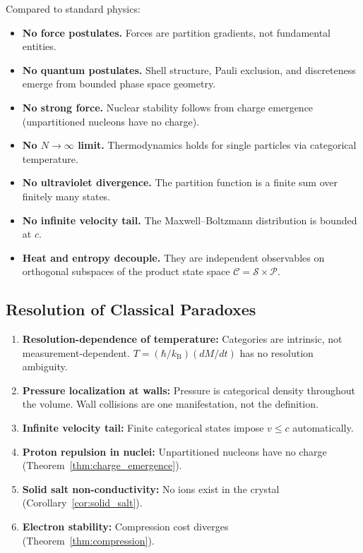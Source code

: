 \documentclass[twocolumn,10pt,a4paper]{article}
\theoremstyle{plain}
\theoremstyle{definition}
\theoremstyle{remark}
\newcommand{\kB}{k_{\mathrm{B}}}
\newcommand{\Partition}{\mathcal{P}}
\newcommand{\Cat}{\mathcal{C}}
\newcommand{\Sspace}{\mathcal{S}}
\begin{document}
Compared to standard physics:
\begin{itemize}
    \item \textbf{No force postulates.} Forces are partition gradients, not fundamental entities.
    \item \textbf{No quantum postulates.} Shell structure, Pauli exclusion, and discreteness emerge from bounded phase space geometry.
    \item \textbf{No strong force.} Nuclear stability follows from charge emergence (unpartitioned nucleons have no charge).
    \item \textbf{No $N \to \infty$ limit.} Thermodynamics holds for single particles via categorical temperature.
    \item \textbf{No ultraviolet divergence.} The partition function is a finite sum over finitely many states.
    \item \textbf{No infinite velocity tail.} The Maxwell--Boltzmann distribution is bounded at $c$.
    \item \textbf{Heat and entropy decouple.} They are independent observables on orthogonal subspaces of the product state space $\Cat = \Sspace \times \Partition$.
\end{itemize}

\subsection{Resolution of Classical Paradoxes}

\begin{enumerate}
    \item \textbf{Resolution-dependence of temperature:} Categories are intrinsic, not measurement-dependent. $T = (\hbar/\kB)(dM/dt)$ has no resolution ambiguity.
    \item \textbf{Pressure localization at walls:} Pressure is categorical density throughout the volume. Wall collisions are one manifestation, not the definition.
    \item \textbf{Infinite velocity tail:} Finite categorical states impose $v \leq c$ automatically.
    \item \textbf{Proton repulsion in nuclei:} Unpartitioned nucleons have no charge (Theorem~\ref{thm:charge_emergence}).
    \item \textbf{Solid salt non-conductivity:} No ions exist in the crystal (Corollary~\ref{cor:solid_salt}).
    \item \textbf{Electron stability:} Compression cost diverges (Theorem~\ref{thm:compression}).
\end{enumerate}
\end{document}
